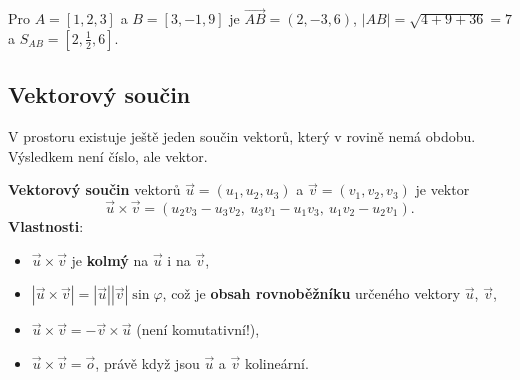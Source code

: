 \begin{center}
\end{center}

\begin{example}
  Pro $A = [1, 2, 3]$ a $B = [3, -1, 9]$ je $\overrightarrow{AB} = (2, -3, 6)$, $|AB| = \sqrt{4 + 9 + 36} = 7$ a $S_{AB} = \left[2, \frac{1}{2}, 6\right]$.
\end{example}

\subsection{Vektorový součin}\label{sec:vektorovy-soucin}

V prostoru existuje ještě jeden součin vektorů, který v rovině nemá obdobu. Výsledkem není číslo, ale vektor.

\begin{definitionbox}
  \textbf{Vektorový součin} vektorů $\vec{u} = (u_1, u_2, u_3)$ a $\vec{v} = (v_1, v_2, v_3)$ je vektor
  \begin{equation*}
    \vec{u}\times\vec{v} = (u_2v_3 - u_3v_2,\ u_3v_1 - u_1v_3,\ u_1v_2 - u_2v_1).
  \end{equation*}
  \textbf{Vlastnosti}:
  \begin{itemize}
    \item $\vec{u}\times\vec{v}$ je \textbf{kolmý} na $\vec{u}$ i na $\vec{v}$,
    \item $|\vec{u}\times\vec{v}| = |\vec{u}||\vec{v}|\sin\varphi$, což je \textbf{obsah rovnoběžníku} určeného vektory $\vec{u}$, $\vec{v}$,
    \item $\vec{u}\times\vec{v} = -\vec{v}\times\vec{u}$ (není komutativní!),
    \item $\vec{u}\times\vec{v} = \vec{o}$, právě když jsou $\vec{u}$ a $\vec{v}$ kolineární.
  \end{itemize}
\end{definitionbox}


